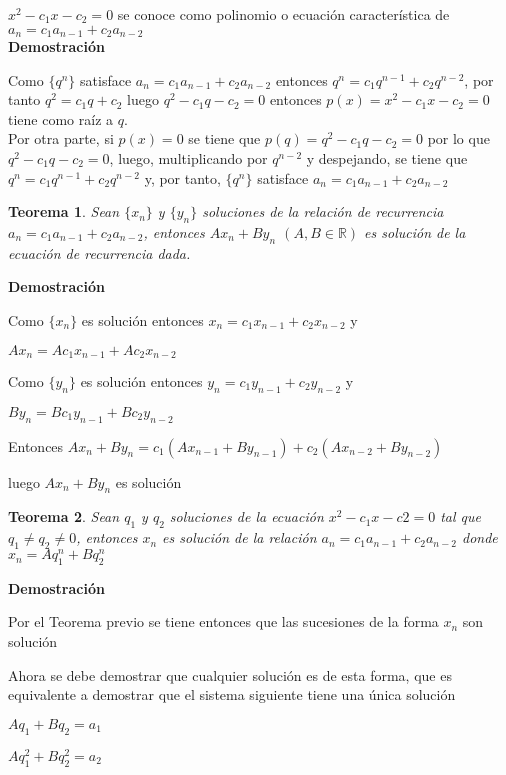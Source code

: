 \documentclass[a4paper,12pt]{report}
\newtheorem*{teo}{Teorema}
\begin{document}
  $x^2-c_1x-c_2=0$ se conoce como polinomio o ecuación característica de $a_n=c_1a_{n-1}+c_2a_{n-2}$ \\

  
   \textbf{Demostración}

   Como $\{q^n\}$ satisface $a_n=c_1a_{n-1}+c_2a_{n-2}$ entonces $q^n=c_1q^{n-1}+c_2q^{n-2}$, por tanto
   $q^2=c_1q+c_2$ luego $q^2-c_1q-c_2=0$ entonces $p(x)=x^2-c_1x-c_2=0$ tiene como raíz a $q$.\\
   
   Por otra parte, si $p(x)=0$ se tiene que $p(q)=q^2-c_1q-c_2=0$ por lo que $q^2-c_1q-c_2=0$, luego, multiplicando por $q^{n-2}$ y despejando, se tiene que 
   $q^n=c_1q^{n-1}+c_2q^{n-2}$ y, por tanto, $\{q^n\}$ satisface $a_n=c_1a_{n-1}+c_2a_{n-2}$
   
\begin{teo}
 Sean $\{x_n\}$ y $\{y_n\}$ soluciones de la relación de recurrencia\\ 
 $a_n=c_1a_{n-1}+c_2a_{n-2}$, entonces $Ax_n + By_n$  $(A,B\in\mathbb{R})$ es solución de la ecuación de recurrencia dada.
\end{teo}

\textbf{Demostración}

Como $\{x_n\}$ es solución entonces $x_n=c_1x_{n-1}+c_2x_{n-2}$ y

$Ax_n=Ac_1x_{n-1}+Ac_2x_{n-2}$

Como $\{y_n\}$ es solución entonces $y_n=c_1y_{n-1}+c_2y_{n-2}$ y

$By_n=Bc_1y_{n-1}+Bc_2y_{n-2}$

Entonces $Ax_n+By_n=c_1(Ax_{n-1}+By_{n-1})+c_2(Ax_{n-2}+By_{n-2})$

luego $Ax_n+By_n$ es solución

\begin{teo}
 Sean $q_1$ y $q_2$ soluciones de la ecuación $x^2-c_1x-c2=0$ tal que $q_1\neq q_2 \neq 0$, entonces $x_n$ es solución de la relación $a_n=c_1a_{n-1}+c_2a_{n-2}$ donde $x_n=Aq^n_1+Bq^n_2$
\end{teo}

\textbf{Demostración}

Por el Teorema previo se tiene entonces que las sucesiones de la forma $x_n$ son solución

Ahora se debe demostrar que cualquier solución es de esta forma, que es equivalente a demostrar que el sistema siguiente tiene una única solución

$Aq_1+Bq_2=a_1$

$Aq^2_1+Bq^2_2=a_2$
\end{document}

